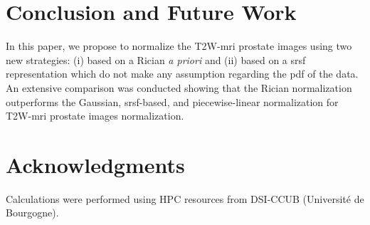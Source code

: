 \section{Conclusion and Future Work}
\label{sec:con}
In this paper, we propose to normalize the T2W-\ac{mri} prostate images using two new strategies: (i) based on a Rician \textit{a priori} and (ii) based on a \ac{srsf} representation which do not make any assumption regarding the \ac{pdf} of the data.
An extensive comparison was conducted showing that the Rician normalization outperforms the Gaussian, \ac{srsf}-based, and piecewise-linear normalization for T2W-\ac{mri} prostate images normalization.

\section*{Acknowledgments}

Calculations were performed using HPC resources from DSI-CCUB (Universit\'e de Bourgogne).

